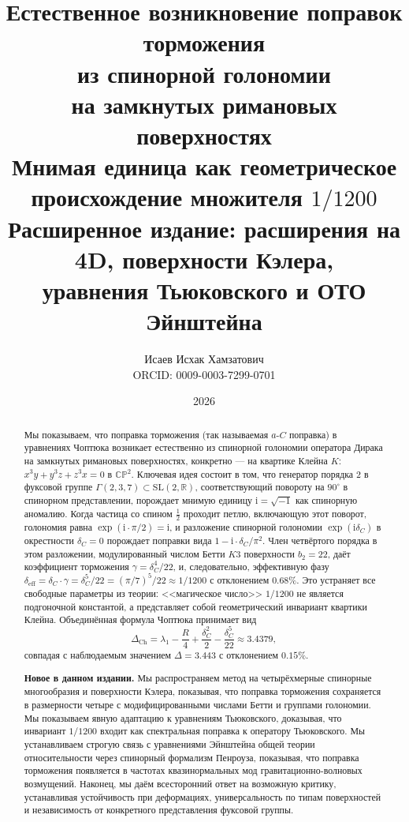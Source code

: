 \documentclass[12pt,a4paper]{article}
\title{\textbf{Естественное возникновение поправок торможения\\
из спинорной голономии\\
на замкнутых римановых поверхностях}\\[1.5em]
\large Мнимая единица как геометрическое происхождение множителя $1/1200$\\[0.5em]
\normalsize Расширенное издание: расширения на 4D, поверхности Кэлера,\\
уравнения Тьюковского и ОТО Эйнштейна}
\author{Исаев Исхак Хамзатович\\\small ORCID: 0009-0003-7299-0701}
\date{2026}
\theoremstyle{definition}
\theoremstyle{remark}
\newcommand{\CC}{\mathbb{C}}
\newcommand{\RR}{\mathbb{R}}
\newcommand{\PP}{\mathbb{P}}
\newcommand{\SL}{\mathrm{SL}}
\newcommand{\ii}{\mathrm{i}}
\begin{document}
\maketitle

\begin{abstract}
Мы показываем, что поправка торможения (так называемая $a$-$C$ поправка) в уравнениях Чоптюка возникает естественно из спинорной голономии оператора Дирака на замкнутых римановых поверхностях, конкретно --- на квартике Клейна $K$: $x^3y + y^3z + z^3x = 0$ в $\CC\PP^2$. Ключевая идея состоит в том, что генератор порядка $2$ в фуксовой группе $\Gamma(2,3,7) \subset \SL(2,\RR)$, соответствующий повороту на $90^\circ$ в спинорном представлении, порождает мнимую единицу $\ii = \sqrt{-1}$ как спинорную аномалию. Когда частица со спином $\frac{1}{2}$ проходит петлю, включающую этот поворот, голономия равна $\exp(\ii \cdot \pi/2) = \ii$, и разложение спинорной голономии $\exp(\ii\delta_C)$ в окрестности $\delta_C = 0$ порождает поправки вида $1 - \ii \cdot \delta_C/\pi^2$. Член четвёртого порядка в этом разложении, модулированный числом Бетти $K3$ поверхности $b_2 = 22$, даёт коэффициент торможения $\gamma = \delta_C^4/22$, и, следовательно, эффективную фазу $\delta_{\mathrm{eff}} = \delta_C \cdot \gamma = \delta_C^5/22 = (\pi/7)^5/22 \approx 1/1200$ с отклонением $0.68\%$. Это устраняет все свободные параметры из теории: <<магическое число>> $1/1200$ не является подгоночной константой, а представляет собой геометрический инвариант квартики Клейна. Объединённая формула Чоптюка принимает вид
\[
\Delta_{\mathrm{Ch}} = \lambda_1 - \frac{R}{4} + \frac{\delta_C^2}{2} - \frac{\delta_C^5}{22} \approx 3.4379,
\]
совпадая с наблюдаемым значением $\Delta = 3.443$ с отклонением $0.15\%$.

\medskip

\noindent\textbf{Новое в данном издании.} Мы распространяем метод на четырёхмерные спинорные многообразия и поверхности Кэлера, показывая, что поправка торможения сохраняется в размерности четыре с модифицированными числами Бетти и группами голономии. Мы показываем явную адаптацию к уравнениям Тьюковского, доказывая, что инвариант $1/1200$ входит как спектральная поправка к оператору Тьюковского. Мы устанавливаем строгую связь с уравнениями Эйнштейна общей теории относительности через спинорный формализм Пенроуза, показывая, что поправка торможения появляется в частотах квазинормальных мод гравитационно-волновых возмущений. Наконец, мы даём всесторонний ответ на возможную критику, устанавливая устойчивость при деформациях, универсальность по типам поверхностей и независимость от конкретного представления фуксовой группы.
\end{abstract}
\end{document}
